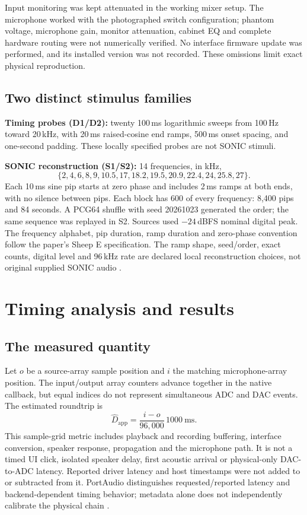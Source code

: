 \documentclass[11pt,letterpaper]{article}
\begin{document}
Input monitoring was kept attenuated in the working mixer setup. The microphone
worked with the photographed switch configuration; phantom voltage, microphone
gain, monitor attenuation, cabinet EQ and complete hardware routing were not
numerically verified. No interface firmware update was performed, and its installed
version was not recorded. These omissions limit exact physical reproduction.

\subsection{Two distinct stimulus families}
\textbf{Timing probes (D1/D2):} twenty 100\,ms logarithmic sweeps from 100\,Hz
toward 20\,kHz, with 20\,ms raised-cosine end ramps, 500\,ms onset spacing, and
one-second padding. These locally specified probes are not SONIC stimuli.

\textbf{SONIC reconstruction (S1/S2):} 14 frequencies, in kHz,
\[
\{2,4,6,8,9,10.5,17,18.2,19.5,20.9,22.4,24,25.8,27\}.
\]
Each 10\,ms sine pip starts at zero phase and includes 2\,ms ramps at both ends,
with no silence between pips. Each block has 600 of every frequency: 8,400 pips
and 84 seconds. A PCG64 shuffle with seed 20261023 generated the order; the same
sequence was replayed in S2. Sources used $-24$\,dBFS nominal digital peak.
The frequency alphabet, pip duration, ramp duration and zero-phase convention
follow the paper's Sheep E specification. The ramp shape, seed/order, exact counts,
digital level and 96\,kHz rate are declared local reconstruction choices, not
original supplied SONIC audio \cite{sonic,pip}.

\newpage
\section{Timing analysis and results}
\subsection{The measured quantity}
Let $o$ be a source-array sample position and $i$ the matching microphone-array
position. The input/output array counters advance together in the native callback,
but equal indices do not represent simultaneous ADC and DAC events. The estimated
roundtrip is
\[
\widehat{D}_{\mathrm{app}}=\frac{i-o}{96{,}000}\,1000\ \mathrm{ms}.
\]
This sample-grid metric includes playback and recording buffering, interface
conversion, speaker response, propagation and the microphone path. It is not a
timed UI click, isolated speaker delay, first acoustic arrival or physical-only
DAC-to-ADC latency. Reported driver latency and host timestamps were not added
to or subtracted from it. PortAudio distinguishes requested/reported latency and
backend-dependent timing behavior; metadata alone does not independently calibrate
the physical chain \cite{portaudio,delay}.
\end{document}
